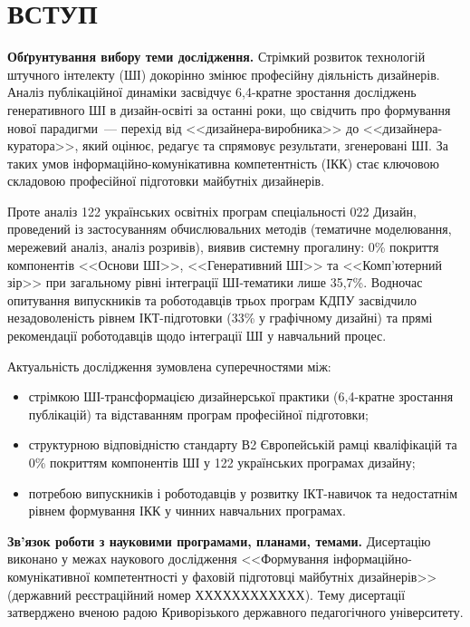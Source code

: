\section*{\centering ВСТУП}

\textbf{Обґрунтування вибору теми дослідження.} Стрімкий розвиток технологій штучного інтелекту (ШІ) докорінно змінює професійну діяльність дизайнерів. Аналіз публікаційної динаміки засвідчує 6,4-кратне зростання досліджень генеративного ШІ в дизайн-освіті за останні роки, що свідчить про формування нової парадигми~--- перехід від <<дизайнера-виробника>> до <<дизайнера-куратора>>, який оцінює, редагує та спрямовує результати, згенеровані ШІ. За таких умов інформаційно-комунікативна компетентність (ІКК) стає ключовою складовою професійної підготовки майбутніх дизайнерів.

Проте аналіз 122 українських освітніх програм спеціальності 022 Дизайн, проведений із застосуванням обчислювальних методів (тематичне моделювання, мережевий аналіз, аналіз розривів), виявив системну прогалину: 0\% покриття компонентів <<Основи ШІ>>, <<Генеративний ШІ>> та <<Комп'ютерний зір>> при загальному рівні інтеграції ШІ-тематики лише 35,7\%. Водночас опитування випускників та роботодавців трьох програм КДПУ засвідчило незадоволеність рівнем ІКТ-підготовки (33\% у графічному дизайні) та прямі рекомендації роботодавців щодо інтеграції ШІ у навчальний процес.

Актуальність дослідження зумовлена суперечностями між:
\begin{itemize}
    \item стрімкою ШІ-трансформацією дизайнерської практики (6,4-кратне зростання публікацій) та відставанням програм професійної підготовки;
    \item структурною відповідністю стандарту В2 Європейській рамці кваліфікацій та 0\% покриттям компонентів ШІ у 122 українських програмах дизайну;
    \item потребою випускників і роботодавців у розвитку ІКТ-навичок та недостатнім рівнем формування ІКК у чинних навчальних програмах.
\end{itemize}

\textbf{Зв'язок роботи з науковими програмами, планами, темами.} Дисертацію виконано у межах наукового дослідження <<Формування інформаційно-комунікативної компетентності у фаховій підготовці майбутніх дизайнерів>> (державний реєстраційний номер ХХХХХХХХХХХХ). Тему дисертації затверджено вченою радою Криворізького державного педагогічного університету.

